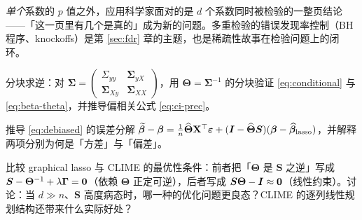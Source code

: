 \textit{单个}系数的 $p$ 值之外，应用科学家面对的是 $d$ 个系数同时被检验的一整页结论——「这一页里有几个是真的」成为新的问题。多重检验的错误发现率控制（BH 程序、knockoffs）是第 \ref{sec:fdr} 章的主题，也是稀疏性故事在检验问题上的闭环。

\begin{exercise}\label{ex:block-inv}
分块求逆：对 $\bm{\Sigma} = \begin{pmatrix} \Sigma_{yy} & \bm{\Sigma}_{yX} \\ \bm{\Sigma}_{Xy} & \bm{\Sigma}_{XX} \end{pmatrix}$，用 $\bm{\Theta} = \bm{\Sigma}^{-1}$ 的分块验证 \eqref{eq:conditional} 与 \eqref{eq:beta-theta}，并推导偏相关公式 \eqref{eq:ci-prec}。
\end{exercise}

\begin{exercise}\label{ex:debiased}
推导 \eqref{eq:debiased} 的误差分解 $\widetilde{\bm{\beta}} - \bm{\beta} = \frac{1}{n}\widehat{\bm{\Theta}}\mathbf{X}^\top\bm{\varepsilon} + (\bm{I} - \widehat{\bm{\Theta}}\bm{S})(\bm{\beta} - \widehat{\bm{\beta}}_{\mathrm{lasso}})$，并解释两项分别为何是「方差」与「偏差」。
\end{exercise}

\begin{exercise}\label{ex:glasso-clime}
比较 graphical lasso 与 CLIME 的最优性条件：前者把「$\bm{\Theta}$ 是 $\bm{S}$ 之逆」写成 $\bm{S} - \bm{\Theta}^{-1} + \lambda\bm{\Gamma} = \mathbf{0}$（依赖 $\bm{\Theta}$ 正定可逆），后者写成 $\bm{S}\bm{\Theta} - \bm{I} \approx \mathbf{0}$（线性约束）。讨论：当 $d \gg n$、$\bm{S}$ 高度病态时，哪一种的优化问题更良态？CLIME 的逐列线性规划结构还带来什么实际好处？
\end{exercise}
